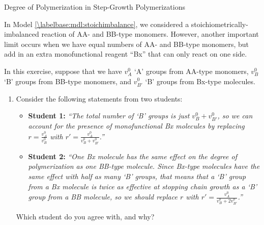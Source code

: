 \begin{activity}{Degree of Polymerization in Step-Growth Polymerizations}
\begin{exercises}
\begin{enumerate}
			\end{enumerate}
		
		\exercise In Model \ref{\labelbase:mdl:stoichimbalance}, we considered a stoichiometrically-imbalanced reaction of AA- and BB-type monomers.  However, another important limit occurs when we have equal numbers of AA- and BB-type monomers, but add in an extra monofunctional reagent ``Bx'' that can only react on one side.
		
			In this exercise, suppose that we have $v_A^0$ `A' groups from AA-type monomers, $v_B^0$ `B' groups from BB-type monomers, and $v_{B'}^0$ `B' groups from Bx-type molecules.
		
			\begin{enumerate}
				\item Consider the following statements from two students:
					
					\begin{itemize}
				
					\item \textbf{Student 1:} \emph{``The total number of `B' groups is just $v_B^0 + v_{B'}^0$, so we can account for the presence of monofunctional Bx molecules by replacing $r=\frac{v_A^0}{v_B^0}$ with $r'=\frac{v_A^0}{v_B^0 + v_{B'}^0}$.''}
					
					\item \textbf{Student 2:} \emph{``One Bx molecule has the same effect on the degree of polymerization as one BB-type molecule.  Since Bx-type molecules have the same effect with half as many `B' groups, that means that a `B' group from a Bx molecule is twice as effective at stopping chain growth as a `B' group from a BB molecule, so we should replace $r$ with $r'=\frac{v_A^0}{v_B^0 + 2v_{B'}^0}$.''}
					\end{itemize}
					
					Which student do you agree with, and why?
				
					\begin{solution}
\end{solution}
\end{enumerate}
\end{exercises}
\end{activity}
